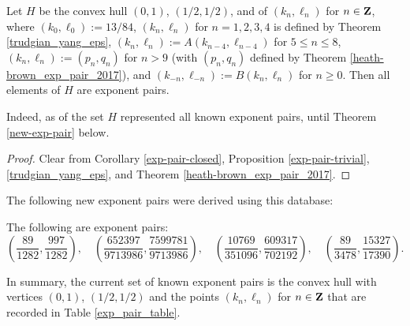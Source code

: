 \begin{corollary}\label{H-pairs}\cite[Theorem 1.3]{trudgian-yang}  Let $H$ be the convex hull $(0,1)$, $(1/2,1/2)$, and of $(k_n,\ell_n)$ for $n \in \mathbf{Z}$, where $(k_0,\ell_0) := 13/84$, $(k_n,\ell_n)$ for $n=1,2,3,4$ is defined by Theorem \ref{trudgian_yang_eps}, $(k_n,\ell_n) := A(k_{n-4},\ell_{n-4})$ for $5 \leq n \leq 8$, $(k_n,\ell_n) := (p_n,q_n)$ for $n > 9$ (with $(p_n,q_n)$ defined by Theorem \ref{heath-brown_exp_pair_2017}), and $(k_{-n},\ell_{-n}) := B(k_n,\ell_n)$ for $n \geq 0$.  Then all elements of $H$ are exponent pairs.
\end{corollary}

Indeed, as of \cite{trudgian-yang} the set $H$ represented all known exponent pairs, until Theorem \ref{new-exp-pair} below.

\begin{proof} Clear from Corollary \ref{exp-pair-closed}, Proposition \ref{exp-pair-trivial}, \ref{trudgian_yang_eps}, and Theorem \ref{heath-brown_exp_pair_2017}.
\end{proof}

The following new exponent pairs were derived using this database:

\begin{theorem}\label{new-exp-pair} The following are exponent pairs:
\[
\left(\frac{89}{1282}, \frac{997}{1282}\right),\quad \left(\frac{652397}{9713986}, \frac{7599781}{9713986}\right),\quad \left(\frac{10769}{351096}, \frac{609317}{702192}\right),\quad \left(\frac{89}{3478}, \frac{15327}{17390}\right).
\]
\end{theorem}
\derived
{}

In summary, the current set of known exponent pairs is the convex hull with vertices $(0, 1)$, $(1/2, 1/2)$ and the points $(k_n, \ell_n)$ for $n \in \mathbf{Z}$ that are recorded in Table \ref{exp_pair_table}.

